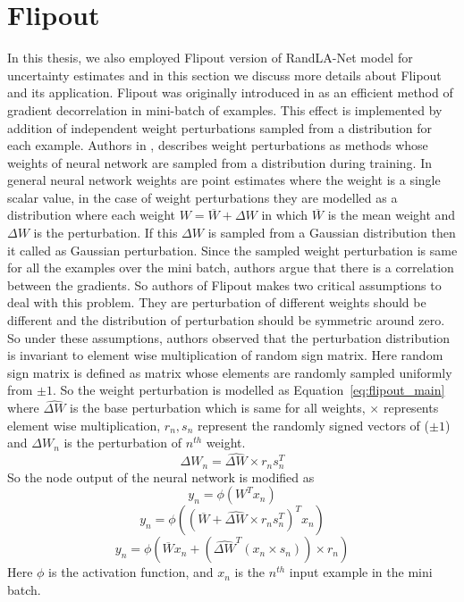 \section{Flipout}
In this thesis, we also employed Flipout version of RandLA-Net model for uncertainty estimates and in this section we discuss more details about Flipout and its application.
Flipout was originally introduced in \cite{Flipout} as an efficient method of gradient decorrelation in mini-batch of examples.
This effect is implemented by addition of independent weight perturbations sampled from a distribution for each example.
Authors in \cite{Flipout}, describes weight perturbations as methods whose weights of neural network are sampled from a distribution during training.
In general neural network weights are point estimates where the weight is a single scalar value, in the case of weight perturbations they are modelled as a distribution where each weight $W=\overline{W}+\Delta W$ in which $\overline{W}$ is the mean weight and $\Delta W$ is the perturbation.
If this $\Delta W$ is sampled from a Gaussian distribution then it called as Gaussian perturbation.
Since the sampled weight perturbation is same for all the examples over the mini batch, authors argue that there is a correlation between the gradients.
So authors of Flipout makes two critical assumptions to deal with this problem. 
They are perturbation of different weights should be different and the distribution of perturbation should be symmetric around zero.
So under these assumptions, authors observed that the perturbation distribution is invariant to element wise multiplication of random sign matrix.
Here random sign matrix is defined as matrix whose elements are randomly sampled uniformly from $\pm 1$. 
So the weight perturbation is modelled as Equation~\ref{eq:flipout_main} where $\widehat{\Delta W}$ is the base perturbation which is same for all weights, $\times$ represents element wise multiplication, $r_n, s_n$ represent the randomly signed vectors of ($\pm 1$) and $\Delta W_n$ is the perturbation of $n^{th}$ weight.
\begin{equation}
    \Delta W_n = \widehat{\Delta W} \times r_n s_{n}^T
    \label{eq:flipout_main}
\end{equation}
So the node output of the neural network is modified as 
$$y_n = \phi(W^T x_n) $$
$$y_n = \phi((\overline{W}+\widehat{\Delta W} \times r_n s_{n}^T)^Tx_n)$$
$$y_n = \phi(\overline{W} x_n+(\widehat{\Delta W}^T (x_n\times s_{n}))\times r_n)$$
Here $\phi$ is the activation function, and $x_n$ is the $n^{th}$ input example in the mini batch.
